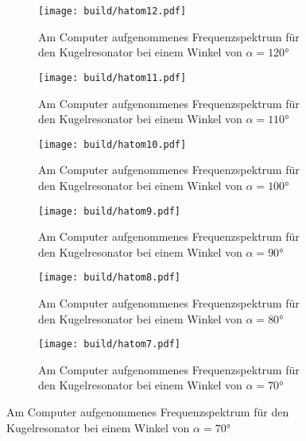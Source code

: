 \begin{figure}
  \centering
  \begin{subfigure}{0.49\textwidth}
    \centering
    \texttt{[image: build/hatom12.pdf]}
    \caption{Am Computer aufgenommenes Frequenzspektrum für den Kugelresonator bei
    einem Winkel von $\alpha=120°$}
    \label{fig:hatom12}
  \end{subfigure}
  \begin{subfigure}{0.49\textwidth}
    \centering
    \texttt{[image: build/hatom11.pdf]}
    \caption{Am Computer aufgenommenes Frequenzspektrum für den Kugelresonator bei
    einem Winkel von $\alpha=110°$}
    \label{fig:hatom11}
  \end{subfigure}
  \begin{subfigure}{0.49\textwidth}
    \centering
    \texttt{[image: build/hatom10.pdf]}
    \caption{Am Computer aufgenommenes Frequenzspektrum für den Kugelresonator bei
    einem Winkel von $\alpha=100°$}
    \label{fig:hatom10}
  \end{subfigure}
  \begin{subfigure}{0.49\textwidth}
    \centering
    \texttt{[image: build/hatom9.pdf]}
    \caption{Am Computer aufgenommenes Frequenzspektrum für den Kugelresonator bei
    einem Winkel von $\alpha=90°$}
    \label{fig:hatom9}
  \end{subfigure}
  \begin{subfigure}{0.49\textwidth}
    \centering
    \texttt{[image: build/hatom8.pdf]}
    \caption{Am Computer aufgenommenes Frequenzspektrum für den Kugelresonator bei
    einem Winkel von $\alpha=80°$}
    \label{fig:hatom8}
  \end{subfigure}
  \begin{subfigure}{0.49\textwidth}
    \centering
    \texttt{[image: build/hatom7.pdf]}
    \caption{Am Computer aufgenommenes Frequenzspektrum für den Kugelresonator bei
    einem Winkel von $\alpha=70°$}
    \label{fig:hatom7}
  \end{subfigure}
\end{figure}


